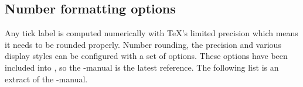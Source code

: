 \subsection{Number formatting options}
\begingroup
\def\examplenumbers{%
	4.568,5e-04,0.1,24415.98123,123456.12345%
}%
\def\showexamplenumberswith#1{%
	\expandafter\showexamplenumberswithXX\expandafter{\examplenumbers}{#1}%
}%
\def\showexamplenumberswithXX#1#2{{%
	\small
	\noindent Example:

	\noindent
	{\ttfamily\textbackslash pgfkeys\{/pgf/number format/.cd,#2\}\par\noindent
	\foreach \x in {#1} {%
		\textbackslash pgfmathprintnumber\{\x\}\par\noindent
	}%
	}%
	 leads to 
	\pgfkeys{/pgf/number format/.cd,#2}%
	\foreach \x in {#1} {\pgfmathprintnumber{\x}\hspace{1em}}.
}}%
\label{sec:number:printing}%
Any tick label is computed numerically with \TeX's limited precision which means it needs to be rounded properly. Number rounding, the precision and various display styles can be configured with a set of options. These options have been included into \PGF, so the \PGF-manual is the latest reference. The following list is an extract of the \PGF-manual.

